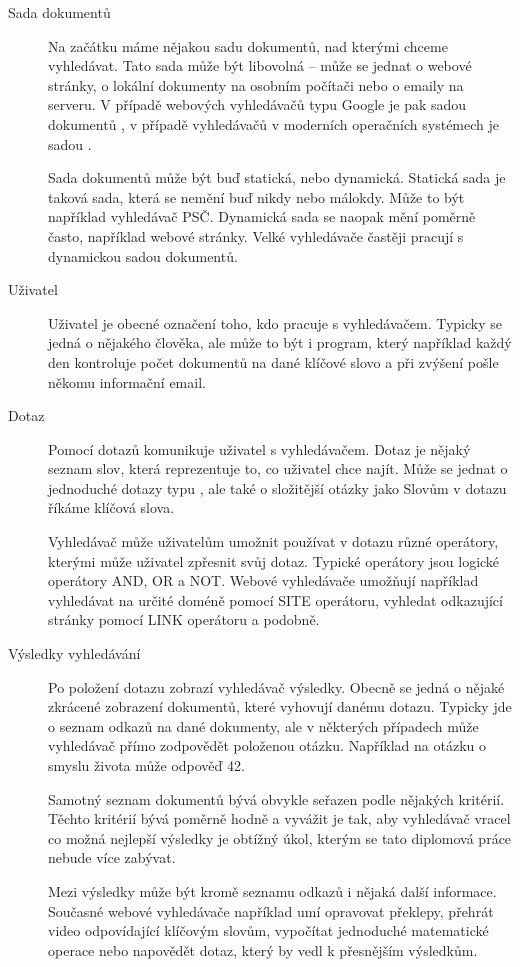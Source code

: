 \documentclass[12pt]{article}
\begin{document}
\begin{description}
\item[Sada dokumentů] Na začátku máme nějakou sadu dokumentů, nad kterými chceme vyhledávat. Tato sada může být libovolná -- může se jednat o webové stránky, o lokální dokumenty na osobním počítači nebo o emaily na serveru. V případě webových vyhledávačů typu Google je pak sadou dokumentů , v případě vyhledávačů v moderních operačních systémech je sadou . 

Sada dokumentů může být buď statická, nebo dynamická. Statická sada je taková sada, která se nemění buď nikdy nebo málokdy. Může to být například vyhledávač PSČ. Dynamická sada se naopak mění poměrně často, například webové stránky. Velké vyhledávače častěji pracují s dynamickou sadou dokumentů. 

\item[Uživatel] Uživatel je obecné označení toho, kdo pracuje s vyhledávačem. Typicky se jedná o nějakého člověka, ale může to být i program, který například každý den kontroluje počet dokumentů na dané klíčové slovo a při zvýšení pošle někomu informační email. 

\item[Dotaz] Pomocí dotazů komunikuje uživatel s vyhledávačem. Dotaz je nějaký seznam slov, která reprezentuje to, co uživatel chce najít. Může se jednat o jednoduché dotazy typu , ale také o složitější otázky jako  Slovům v dotazu říkáme klíčová slova. 

Vyhledávač může uživatelům umožnit používat v dotazu různé operátory, kterými může uživatel zpřesnit svůj dotaz. Typické operátory jsou logické operátory AND, OR a NOT. Webové vyhledávače umožňují například vyhledávat na určité doméně pomocí SITE operátoru, vyhledat odkazující stránky pomocí LINK operátoru a podobně. 

\item[Výsledky vyhledávání] Po položení dotazu zobrazí vyhledávač výsledky. Obecně se jedná o nějaké zkrácené zobrazení dokumentů, které vyhovují danému dotazu. Typicky jde o seznam odkazů na dané dokumenty, ale v některých případech může vyhledávač přímo zodpovědět položenou otázku. Například na otázku o smyslu života může odpověď 42. 

Samotný seznam dokumentů bývá obvykle seřazen podle nějakých kritérií. Těchto kritérií bývá poměrně hodně a vyvážit je tak, aby vyhledávač vracel co možná nejlepší výsledky je obtížný úkol, kterým se tato diplomová práce nebude více zabývat. 

Mezi výsledky může být kromě seznamu odkazů i nějaká další informace. Současné webové vyhledávače například umí opravovat překlepy, přehrát video odpovídající klíčovým slovům, vypočítat jednoduché matematické operace nebo napovědět dotaz, který by vedl k přesnějším výsledkům. 
\end{description}
\end{document}

